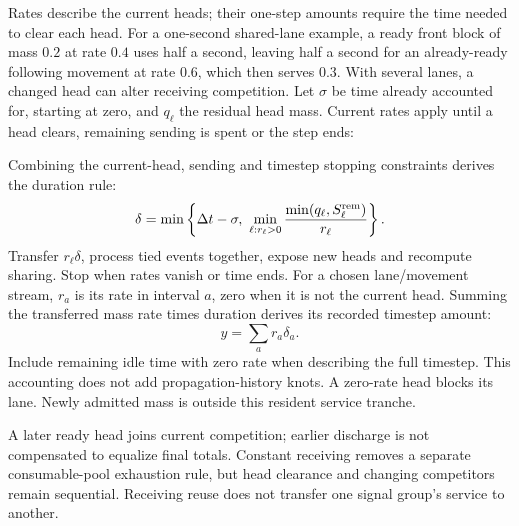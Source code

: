 \documentclass[10pt,a4paper]{article}
\begin{document}
Rates describe the current heads; their one-step amounts require the
time needed to clear each head. For a one-second shared-lane example,
a ready front block of mass $0.2$ at rate $0.4$ uses half a second,
leaving half a second for an already-ready following movement at rate
$0.6$, which then serves $0.3$. With several lanes, a changed head can
alter receiving competition. Let $\sigma$ be time already accounted for,
starting at zero, and $q_\ell$ the residual head mass. Current rates apply
until a head clears, remaining sending is spent or the step ends:
\par
Combining the current-head, sending and timestep stopping constraints derives the duration rule:
\begin{equation}
 \delta=\min\left\{\Delta t-\sigma,\
 \min_{\ell:r_\ell>0}
       \frac{\min(q_\ell,S_\ell^{\rm rem})}{r_\ell}\right\}.
 \label{eq:head-time}
\end{equation}
Transfer $r_\ell\delta$, process tied events together, expose new heads
and recompute sharing. Stop when rates vanish or time ends.
For a chosen lane/movement stream, $r_a$ is its rate in interval $a$,
zero when it is not the current head.
Summing the transferred mass rate times duration derives its recorded timestep amount:
\begin{equation}
 y=\sum_a r_a\delta_a.
 \label{eq:service-amount}
\end{equation}
Include remaining idle time with zero rate when describing the full
timestep. This accounting does not add propagation-history knots.
A zero-rate head blocks its lane. Newly admitted mass is outside this
resident service tranche.

A later ready head joins current competition; earlier discharge is not
compensated to equalize final totals. Constant receiving removes a
separate consumable-pool exhaustion rule, but head clearance and changing
competitors remain sequential. Receiving reuse does not transfer one
signal group's service to another.
\end{document}
